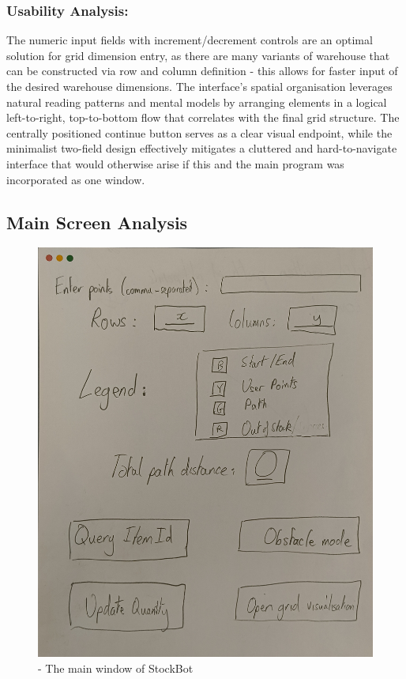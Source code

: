 \subsubsection{Usability Analysis:}

The numeric input fields with increment/decrement controls are an optimal solution for grid dimension entry, as there are many variants of warehouse that can be constructed via row and column definition - this allows for faster input of the desired warehouse dimensions. \newline The interface's spatial organisation leverages natural reading patterns and mental models by arranging elements in a logical left-to-right, top-to-bottom flow that correlates with the final grid structure. \newline The centrally positioned continue button serves as a clear visual endpoint, while the minimalist two-field design effectively mitigates a cluttered and hard-to-navigate interface that would otherwise arise if this and the main program was incorporated as one window.

\subsection{Main Screen Analysis}

\begin{figure}[!htbp]
    \centering
    \includegraphics[width=1\linewidth]{Images/GUI.jpg}
    \caption{- The main window of StockBot}
\end{figure}

